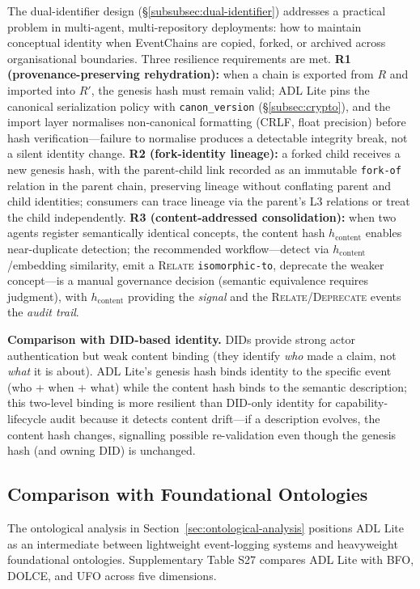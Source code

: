 The dual-identifier design (\S\ref{subsubsec:dual-identifier}) addresses a practical problem in multi-agent, multi-repository deployments: how to maintain conceptual identity when EventChains are copied, forked, or archived across organisational boundaries. Three resilience requirements are met. \textbf{R1 (provenance-preserving rehydration):} when a chain is exported from $R$ and imported into $R'$, the genesis hash must remain valid; ADL Lite pins the canonical serialization policy with \texttt{canon\_version} (\S\ref{subsec:crypto}), and the import layer normalises non-canonical formatting (CRLF, float precision) before hash verification---failure to normalise produces a detectable integrity break, not a silent identity change. \textbf{R2 (fork-identity lineage):} a forked child receives a new genesis hash, with the parent-child link recorded as an immutable \texttt{fork-of} relation in the parent chain, preserving lineage without conflating parent and child identities; consumers can trace lineage via the parent's L3 relations or treat the child independently. \textbf{R3 (content-addressed consolidation):} when two agents register semantically identical concepts, the content hash $h_{\text{content}}$ enables near-duplicate detection; the recommended workflow---detect via $h_{\text{content}}$/embedding similarity, emit a \textsc{Relate} \texttt{isomorphic-to}, deprecate the weaker concept---is a manual governance decision (semantic equivalence requires judgment), with $h_{\text{content}}$ providing the \emph{signal} and the \textsc{Relate}/\textsc{Deprecate} events the \emph{audit trail}.

\textbf{Comparison with DID-based identity.} DIDs provide strong actor authentication but weak content binding (they identify \emph{who} made a claim, not \emph{what} it is about). ADL Lite's genesis hash binds identity to the specific event (who + when + what) while the content hash binds to the semantic description; this two-level binding is more resilient than DID-only identity for capability-lifecycle audit because it detects content drift---if a description evolves, the content hash changes, signalling possible re-validation even though the genesis hash (and owning DID) is unchanged.

\subsection{Comparison with Foundational Ontologies}\label{subsec:comparison-foundational}

The ontological analysis in Section~\ref{sec:ontological-analysis} positions ADL Lite as an intermediate between lightweight event-logging systems and heavyweight foundational ontologies. Supplementary Table S27 compares ADL Lite with BFO, DOLCE, and UFO across five dimensions.

